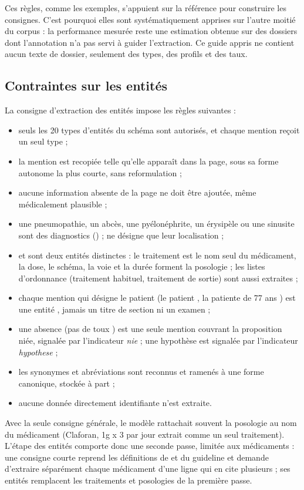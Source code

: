 Ces règles, comme les exemples, s'appuient sur la référence pour construire les consignes. C'est pourquoi elles sont systématiquement apprises sur l'autre moitié du corpus : la performance mesurée reste une estimation obtenue sur des dossiers dont l'annotation n'a pas servi à guider l'extraction. Ce guide appris ne contient aucun texte de dossier, seulement des types, des profils et des taux.

\subsection{Contraintes sur les entités}\label{sec:c4-contraintes-entites}

La consigne d'extraction des entités impose les règles suivantes :
\begin{itemize}
  \item seuls les 20 types d'entités du schéma sont autorisés, et chaque mention reçoit un seul type ;
  \item la mention est recopiée telle qu'elle apparaît dans la page, sous sa forme autonome la plus courte, sans reformulation ;
  \item aucune information absente de la page ne doit être ajoutée, même médicalement plausible ;
  \item une pneumopathie, un abcès, une pyélonéphrite, un érysipèle ou une sinusite sont des diagnostics () ;  ne désigne que leur localisation ;
  \item {} et  sont deux entités distinctes : le traitement est le nom seul du médicament, la dose, le schéma, la voie et la durée forment la posologie ; les listes d'ordonnance (traitement habituel, traitement de sortie) sont aussi extraites ;
  \item chaque mention qui désigne le patient (\og le patient \fg{}, \og la patiente de 77 ans \fg{}) est une entité , jamais un titre de section ni un examen ;
  \item une absence (\og pas de toux \fg{}) est une seule mention couvrant la proposition niée, signalée par l'indicateur \emph{nie} ; une hypothèse est signalée par l'indicateur \emph{hypothese} ;
  \item les synonymes et abréviations sont reconnus et ramenés à une forme canonique, stockée à part ;
  \item aucune donnée directement identifiante n'est extraite.
\end{itemize}
Avec la seule consigne générale, le modèle rattachait souvent la posologie au nom du médicament (\og Claforan, 1g x 3 par jour \fg{} extrait comme un seul traitement). L'étape des entités comporte donc une seconde passe, limitée aux médicaments : une consigne courte reprend les définitions de  et  du guideline et demande d'extraire séparément chaque médicament d'une ligne qui en cite plusieurs ; ses entités remplacent les traitements et posologies de la première passe.


